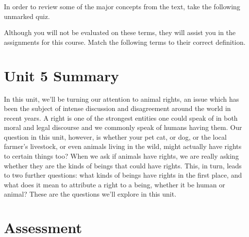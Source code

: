 \documentclass[
]{book}
\begin{document}
\begin{reflect}
In order to review some of the major concepts from the text, take the following unmarked quiz.

Although you will not be evaluated on these terms, they will assist you in the assignments for this course. Match the following terms to their correct definition.
\end{reflect}

\hypertarget{unit-5-summary}{%
\section*{Unit 5 Summary}\label{unit-5-summary}}

In this unit, we'll be turning our attention to animal rights, an issue which has been the subject of intense discussion and disagreement around the world in recent years. A right is one of the strongest entities one could speak of in both moral and legal discourse and we commonly speak of humans having them. Our question in this unit, however, is whether your pet cat, or dog, or the local farmer's livestock, or even animals living in the wild, might actually have rights to certain things too? When we ask if animals have rights, we are really asking whether they are the kinds of beings that could have rights. This, in turn, leads to two further questions: what kinds of beings have rights in the first place, and what does it mean to attribute a right to a being, whether it be human or animal? These are the questions we'll explore in this unit.

\hypertarget{assessment-9}{%
\section*{Assessment}\label{assessment-9}}
\end{document}
